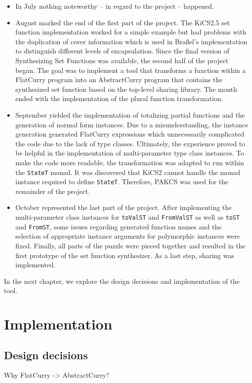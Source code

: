 \documentclass[a4paper, 11pt, fleqn]{scrreprt}
\newcommand{\cinline}[1]{\texttt{#1}}
\begin{document}
\begin{itemize}
    \item In July nothing noteworthy -- in regard to the project -- happened.
    \item August marked the end of the first part of the project. The KiCS2.5 set function implementation worked for a simple example but had problems with the duplication of cover information which is used in Braßel's implementation to distinguish different levels of encapsulation. Since the final version of Synthesizing Set Functions was available, the second half of the project began. The goal was to implement a tool that transforms a function within a FlatCurry program into an AbstractCurry program that contains the synthesized set function based on the top-level sharing library. The month ended with the implementation of the plural function transformation.
    \item September yielded the implementation of totalizing partial functions and the generation of normal form instances. Due to a misunderstanding, the instance generation generated FlatCurry expressions which unnecessarily complicated the code due to the lack of type classes. Ultimately, the experience proved to be helpful in the implementation of  multi-parameter type class instances. To make the code more readable, the transformation was adapted to run within the \cinline{StateT} monad. It was discovered that KiCS2 cannot handle the monad instance required to define \cinline{StateT}.  Therefore, PAKCS was used for the remainder of the project.
    \item October represented the last part of the project. After implementing the multi-parameter class instances for \cinline{toValST} and \cinline{FromValST} as well as \cinline{toST} and \cinline{FromST}, some issues regarding generated function names and the selection of appropriate instance arguments for polymorphic instances were fixed. Finally, all parts of the puzzle were pieced together and resulted in the first prototype of the set function synthesizer. As a last step, sharing was implemented. 
\end{itemize}
In the next chapter, we explore the design decisions and implementation of the tool.
\chapter{Implementation}
\section{Design decisions}
Why FlatCurry -> AbstractCurry?
\end{document}
